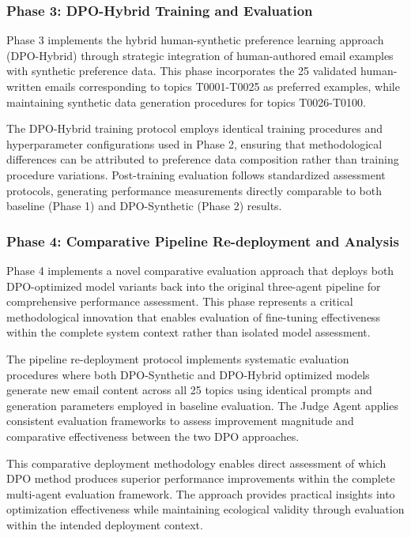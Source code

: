 \subsubsection{Phase 3: DPO-Hybrid Training and Evaluation}

Phase 3 implements the hybrid human-synthetic preference learning approach (DPO-Hybrid) through strategic integration of human-authored email examples with synthetic preference data. This phase incorporates the 25 validated human-written emails corresponding to topics T0001-T0025 as preferred examples, while maintaining synthetic data generation procedures for topics T0026-T0100.

The DPO-Hybrid training protocol employs identical training procedures and hyperparameter configurations used in Phase 2, ensuring that methodological differences can be attributed to preference data composition rather than training procedure variations. Post-training evaluation follows standardized assessment protocols, generating performance measurements directly comparable to both baseline (Phase 1) and DPO-Synthetic (Phase 2) results.

\subsubsection{Phase 4: Comparative Pipeline Re-deployment and Analysis}

Phase 4 implements a novel comparative evaluation approach that deploys both DPO-optimized model variants back into the original three-agent pipeline for comprehensive performance assessment. This phase represents a critical methodological innovation that enables evaluation of fine-tuning effectiveness within the complete system context rather than isolated model assessment.

The pipeline re-deployment protocol implements systematic evaluation procedures where both DPO-Synthetic and DPO-Hybrid optimized models generate new email content across all 25 topics using identical prompts and generation parameters employed in baseline evaluation. The Judge Agent applies consistent evaluation frameworks to assess improvement magnitude and comparative effectiveness between the two DPO approaches.

This comparative deployment methodology enables direct assessment of which DPO method produces superior performance improvements within the complete multi-agent evaluation framework. The approach provides practical insights into optimization effectiveness while maintaining ecological validity through evaluation within the intended deployment context.

